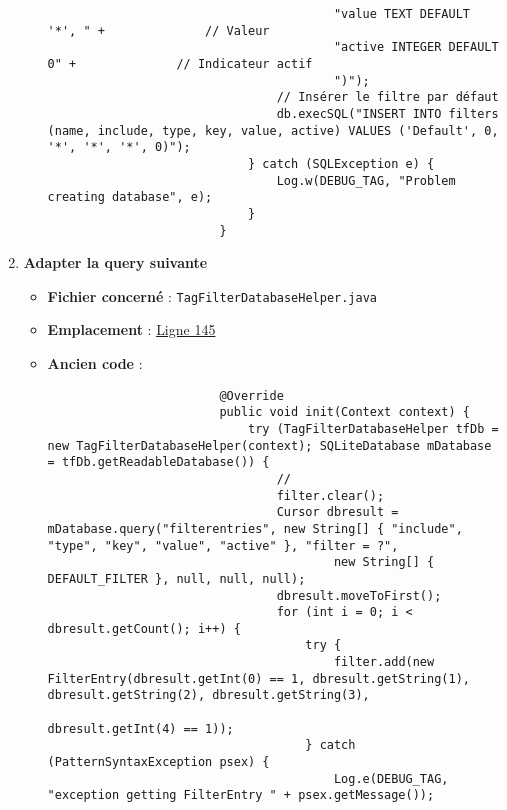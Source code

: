 \begin{enumerate}
\begin{itemize}
\begin{verbatim}
                                        "value TEXT DEFAULT '*', " +              // Valeur
                                        "active INTEGER DEFAULT 0" +              // Indicateur actif
                                        ")");
                                // Insérer le filtre par défaut
                                db.execSQL("INSERT INTO filters (name, include, type, key, value, active) VALUES ('Default', 0, '*', '*', '*', 0)");
                            } catch (SQLException e) {
                                Log.w(DEBUG_TAG, "Problem creating database", e);
                            }
                        }
                    \end{verbatim}
          \end{itemize}
    \item \textbf{Adapter la query suivante}
          \begin{itemize}
              \item \textbf{Fichier concerné} : \texttt{TagFilterDatabaseHelper.java}
              \item \textbf{Emplacement} :
                    \href{https://github.com/MarcusWolschon/osmeditor4android/blob/dcabe8084aa15f5551a37c990516bf73398af1bf/src/main/java/de/blau/android/filter/TagFilter.java#L145}{Ligne 145}
              \item \textbf{Ancien code} :
                    \begin{verbatim}
                        @Override
                        public void init(Context context) {
                            try (TagFilterDatabaseHelper tfDb = new TagFilterDatabaseHelper(context); SQLiteDatabase mDatabase = tfDb.getReadableDatabase()) {
                                //
                                filter.clear();
                                Cursor dbresult = mDatabase.query("filterentries", new String[] { "include", "type", "key", "value", "active" }, "filter = ?",
                                        new String[] { DEFAULT_FILTER }, null, null, null);
                                dbresult.moveToFirst();
                                for (int i = 0; i < dbresult.getCount(); i++) {
                                    try {
                                        filter.add(new FilterEntry(dbresult.getInt(0) == 1, dbresult.getString(1), dbresult.getString(2), dbresult.getString(3),
                                                dbresult.getInt(4) == 1));
                                    } catch (PatternSyntaxException psex) {
                                        Log.e(DEBUG_TAG, "exception getting FilterEntry " + psex.getMessage());

\end{verbatim}
\end{itemize}
\end{enumerate}
